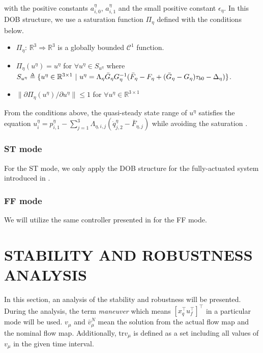 \documentclass[letterpaper, 10 pt, conference]{ieeeconf}  %
\def\delequal{\mathrel{\ensurestackMath{\stackon[1pt]{=}{\scriptscriptstyle\Delta}}}}
\theoremstyle{definition}
\begin{document}
with the positive constants $a^{\eta}_{i, 0}$, $a^{\eta}_{i, 1}$ and the small positive constant $\epsilon_{\eta}$. In this DOB structure, {we use a saturation function $\Pi_{\eta}$ defined with the conditions below.}
\begin{itemize}
    \item $\Pi_{\eta}$: $\mathbb{R}^3 \Rightarrow \mathbb{R}^3$ is a globally bounded $\mathcal{C}^1$ function.
    \item \label{equality condition for saturation function} $\Pi_{\eta}(u^{\eta}) = u^{\eta}$ for $\forall u^{\eta} \in S_{u^{\eta}}$ where $S_{u^{\eta}} \delequal \{ u^{\eta} \in \mathbb{R}^{3 \times 1} \ | \ u^{\eta} = \Lambda_{\eta}\bar{G}_{\eta}G_{\eta}^{-1}(\bar{F}_{\eta} - F_{\eta} + (\bar{G}_{\eta} - G_{\eta})\tau_{b 0} - \Delta_{\eta}) \}$.
    \item $\| \partial \Pi_{\eta}(u^{\eta}) / \partial u^{\eta} \| \leq 1$ for $\forall u^{\eta} \in \mathbb{R}^{3 \times 1}$
\end{itemize}
From the conditions above, the quasi-steady state range of $u^{\eta}$ satisfies the equation $u^{\eta}_i = p^{\eta}_{i, 1} - \sum_{j = 1}^{3}\Lambda_{\eta, i, j}(\dot{q}^{\eta}_{j, 2}-\bar{F}_{\eta, j})$ while avoiding the saturation \cite{back2009inner}.

\subsubsection{ST mode}
For the ST mode, we only apply the DOB structure for the fully-actuated system introduced in \cite{kim2017robust}.

\subsubsection{FF mode}
We will utilize the same controller presented in \cite{lee2020aerial_2} for the FF mode.

\section{STABILITY AND ROBUSTNESS ANALYSIS}
In this section, an analysis of the stability and robustness will be presented. During the analysis, the term \textit{maneuver} which means $[x_{q}^{\top} u_f^{\top}]^{\top}$ in a particular mode will be used. $v_{\mu}$ and $\bar{v}_{\mu}^N$ mean the solution from the actual flow map and the nominal flow map. Additionally, tr$v_{\mu}$ is defined as a set including all values of $v_{\mu}$ in the given time interval.
\end{document}
